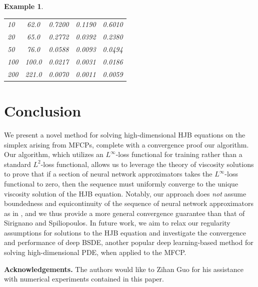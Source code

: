 \documentclass[11pt,reqno]{amsart}
\numberwithin{equation}{section}
\theoremstyle{plain}
\newtheorem{example}[theorem]{Example}
\begin{document}
\begin{example}
\begin{table}[H]
\begin{center}
\begin{small}
\begin{sc}
\begin{tabular}{lcccr}
10 & 62.0 & 0.7200 & 0.1190 & 0.6010 \\
20 & 65.0 & 0.2772 & 0.0392 &  0.2380 \\
50 & 76.0 & 0.0588 & 0.0093 & 0.0494 \\
100 & 100.0 & 0.0217 & 0.0031 & 0.0186 \\ 
200 & 221.0 & 0.0070 & 0.0011 & 0.0059 \\
\bottomrule
\end{tabular}
\end{sc}
\end{small}
\end{center}
\vskip -0.1in
\end{table}
\end{example}
\section{Conclusion}
We present a novel method for solving high-dimensional HJB equations on the simplex arising from MFCPs, complete with a convergence proof our algorithm. Our algorithm, which utilizes an $L^\infty$-loss functional for training rather than a standard $L^2$-loss functional, allows us to leverage the theory of viscosity solutions to prove that if a section of neural network approximators takes the $L^\infty$-loss functional to zero, then the sequence must uniformly converge to the unique viscosity solution of the HJB equation. Notably, our approach does \textit{not} assume boundedness and equicontinuity of the sequence of neural network approximators as in \cite{dgm}, and we thus provide a more general convergence guarantee than that of Sirignano and Spiliopoulos. In future work, we aim to relax our regularity assumptions for solutions to the HJB equation and investigate the convergence and performance of deep BSDE, another popular deep learning-based method for solving high-dimensional PDE, when applied to the MFCP.

\vspace{10pt}
\noindent
{\bf Acknowledgements.} 
The authors would like to Zihan Guo for his assistance with numerical experiments contained in this paper.



\normalfont

\appendix
\end{document}
